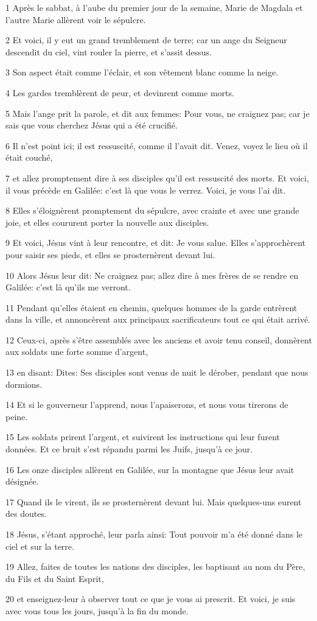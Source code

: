\par 1 Après le sabbat, à l'aube du premier jour de la semaine, Marie de Magdala et l'autre Marie allèrent voir le sépulcre.
\par 2 Et voici, il y eut un grand tremblement de terre; car un ange du Seigneur descendit du ciel, vint rouler la pierre, et s'assit dessus.
\par 3 Son aspect était comme l'éclair, et son vêtement blanc comme la neige.
\par 4 Les gardes tremblèrent de peur, et devinrent comme morts.
\par 5 Mais l'ange prit la parole, et dit aux femmes: Pour vous, ne craignez pas; car je sais que vous cherchez Jésus qui a été crucifié.
\par 6 Il n'est point ici; il est ressuscité, comme il l'avait dit. Venez, voyez le lieu où il était couché,
\par 7 et allez promptement dire à ses disciples qu'il est ressuscité des morts. Et voici, il vous précède en Galilée: c'est là que vous le verrez. Voici, je vous l'ai dit.
\par 8 Elles s'éloignèrent promptement du sépulcre, avec crainte et avec une grande joie, et elles coururent porter la nouvelle aux disciples.
\par 9 Et voici, Jésus vint à leur rencontre, et dit: Je vous salue. Elles s'approchèrent pour saisir ses pieds, et elles se prosternèrent devant lui.
\par 10 Alors Jésus leur dit: Ne craignez pas; allez dire à mes frères de se rendre en Galilée: c'est là qu'ils me verront.
\par 11 Pendant qu'elles étaient en chemin, quelques hommes de la garde entrèrent dans la ville, et annoncèrent aux principaux sacrificateurs tout ce qui était arrivé.
\par 12 Ceux-ci, après s'être assemblés avec les anciens et avoir tenu conseil, donnèrent aux soldats une forte somme d'argent,
\par 13 en disant: Dites: Ses disciples sont venus de nuit le dérober, pendant que nous dormions.
\par 14 Et si le gouverneur l'apprend, nous l'apaiserons, et nous vous tirerons de peine.
\par 15 Les soldats prirent l'argent, et suivirent les instructions qui leur furent données. Et ce bruit s'est répandu parmi les Juifs, jusqu'à ce jour.
\par 16 Les onze disciples allèrent en Galilée, sur la montagne que Jésus leur avait désignée.
\par 17 Quand ils le virent, ils se prosternèrent devant lui. Mais quelques-uns eurent des doutes.
\par 18 Jésus, s'étant approché, leur parla ainsi: Tout pouvoir m'a été donné dans le ciel et sur la terre.
\par 19 Allez, faites de toutes les nations des disciples, les baptisant au nom du Père, du Fils et du Saint Esprit,
\par 20 et enseignez-leur à observer tout ce que je vous ai prescrit. Et voici, je suis avec vous tous les jours, jusqu'à la fin du monde.



